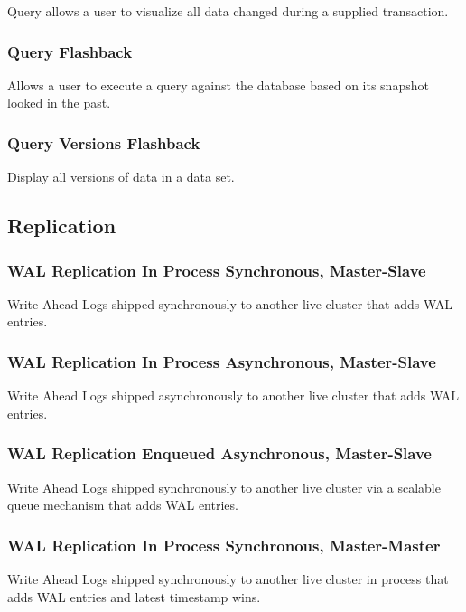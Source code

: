 Query allows a user to visualize all data changed during a supplied transaction.

\subsubsection{Query Flashback}

Allows a user to execute a query against the database based on its snapshot
looked in the past.

\subsubsection{Query Versions Flashback}

Display all versions of data in a data set.

\subsection{Replication}

\subsubsection{WAL Replication In Process Synchronous, Master-Slave}

Write Ahead Logs shipped synchronously to another live cluster that adds WAL
entries.

\subsubsection{WAL Replication In Process Asynchronous, Master-Slave}

Write Ahead Logs shipped asynchronously to another live cluster that adds WAL
entries.

\subsubsection{WAL Replication Enqueued Asynchronous, Master-Slave}

Write Ahead Logs shipped synchronously to another live cluster via a scalable
queue mechanism that adds WAL entries.

\subsubsection{WAL Replication In Process Synchronous, Master-Master}

Write Ahead Logs shipped synchronously to another live cluster in process that
adds WAL entries and latest timestamp wins.

